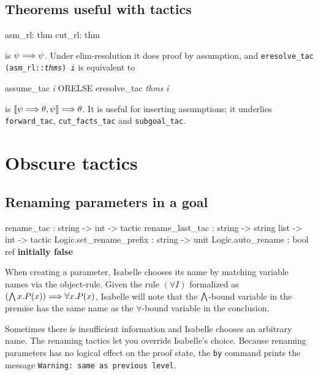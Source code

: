 \subsection{Theorems useful with tactics}
\begin{ttbox} 
asm_rl: thm 
cut_rl: thm 
\end{ttbox}
\begin{ttdescription}
\item[\tdx{asm_rl}] 
is $\psi\Longrightarrow\psi$.  Under elim-resolution it does proof by assumption, and
\hbox{\tt eresolve_tac (asm_rl::{\it thms}) {\it i}} is equivalent to
\begin{ttbox} 
assume_tac {\it i}  ORELSE  eresolve_tac {\it thms} {\it i}
\end{ttbox}

\item[\tdx{cut_rl}] 
is $\mathopen{[\![}\psi\Longrightarrow\theta,\psi\mathclose{]\!]}\Longrightarrow\theta$.  It is useful for inserting
assumptions; it underlies {\tt forward_tac}, {\tt cut_facts_tac}
and {\tt subgoal_tac}.
\end{ttdescription}


\section{Obscure tactics}

\subsection{Renaming parameters in a goal} 
\begin{ttbox} 
rename_tac        : string -> int -> tactic
rename_last_tac   : string -> string list -> int -> tactic
Logic.set_rename_prefix : string -> unit
Logic.auto_rename       : bool ref      \hfill{\bf initially false}
\end{ttbox}
When creating a parameter, Isabelle chooses its name by matching variable
names via the object-rule.  Given the rule $(\forall I)$ formalized as
$\left(\bigwedge x. P(x)\right) \Longrightarrow \forall x.P(x)$, Isabelle will note that
the $\bigwedge$-bound variable in the premise has the same name as the
$\forall$-bound variable in the conclusion.  

Sometimes there is insufficient information and Isabelle chooses an
arbitrary name.  The renaming tactics let you override Isabelle's choice.
Because renaming parameters has no logical effect on the proof state, the
{\tt by} command prints the message {\tt Warning:\ same as previous
level}.


